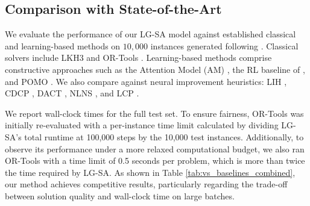 \documentclass[letterpaper]{article} %
\begin{document}

\subsection{Comparison with State-of-the-Art}
We evaluate the performance of our LG-SA model against established classical and learning-based methods on $10{,}000$ instances generated following \citet{nazari_reinforcement_2018}.
Classical solvers include LKH3 \cite{helsgaun_extension_2017} and OR-Tools \cite{ortools_routing}. Learning-based methods comprise constructive approaches such as the Attention Model (AM) \cite{kool_attention_2019}, the RL baseline of \citet{nazari_reinforcement_2018}, and POMO \citet{kwon_pomo_2021}. We also compare against neural improvement heuristics: LIH \citep{wu_learning_2022}, CDCP \citep{garcia-torres_combining_2022}, DACT \citep{ma_learning_2021}, NLNS \citep{hottung_neural_2022}, and LCP \citet{kim_learning_2021}.

We report wall-clock times for the full test set. To ensure fairness, OR-Tools was initially re-evaluated with a per-instance time limit calculated by dividing LG-SA's total runtime at 100,000 steps by the 10,000 test instances. Additionally, to observe its performance under a more relaxed computational budget, we also ran OR-Tools with a time limit of 0.5 seconds per problem, which is more than twice the time required by LG-SA. As shown in Table \ref{tab:vs_baselines_combined}, our method achieves competitive results, particularly regarding the trade-off between solution quality and wall-clock time on large batches.
\end{document}
